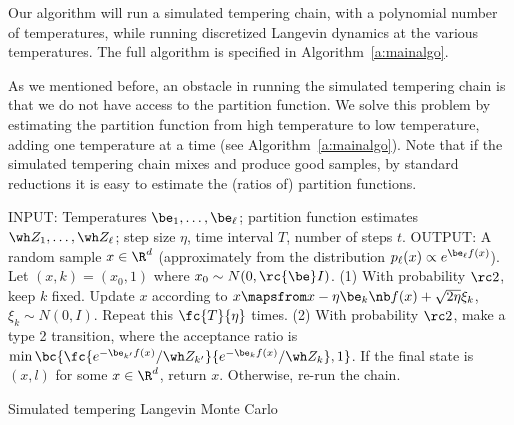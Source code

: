 \label{sec:overview-alg}

Our algorithm will run a simulated tempering chain, with a polynomial number of temperatures, while running discretized Langevin dynamics at the various temperatures. The full algorithm is specified in Algorithm~\ref{a:mainalgo}. 

As we mentioned before, an obstacle in running the simulated tempering chain is that we do not have access to the partition function. We solve this problem by estimating the partition function from high temperature to low temperature, adding one temperature at a time (see Algorithm~\ref{a:mainalgo}). Note that if the simulated tempering chain mixes and produce good samples, by standard reductions it is easy to estimate the (ratios of) partition functions.

\begin{algorithm}
\begin{algorithmic}
\STATE INPUT: Temperatures $\be_1,\ldots, \be_\ell$; partition function estimates $\wh Z_1,\ldots, \wh Z_\ell$; step size $\eta$, time interval $T$, number of steps $t$.
\STATE OUTPUT: A random sample $x\in \R^d$ (approximately from the distribution $p_\ell(x)\propto e^{\be_\ell f(x)}$).
\STATE Let $(x,k)=(x_0,1)$ where $x_0\sim N(0, \rc{\be}I)$.
\STATE (1) With probability $\rc 2$, keep $k$ fixed. Update $x$ according to $x \mapsfrom x - \eta \be_k\nb f(x) +\sqrt{2\eta}\xi_k$, $\xi_k\sim N(0,I)$. Repeat this $\fc{T}{\eta}$ times.
\STATE (2) With probability $\rc2$, make a type 2 transition, where the acceptance ratio is 
$\min \bc{
\fc{e^{-\be_{k'}f(x)}/\wh Z_{k'}}
{e^{-\be_{k}f(x)}/\wh Z_{k}}, 1
}
$.
\ENDFOR
\STATE If the final state is $(x,l)$ for some $x\in \R^d$, return $x$. Otherwise, re-run the chain.
\end{algorithmic}
 \caption{Simulated tempering Langevin Monte Carlo}
 \label{a:stlmc}
\end{algorithm}

